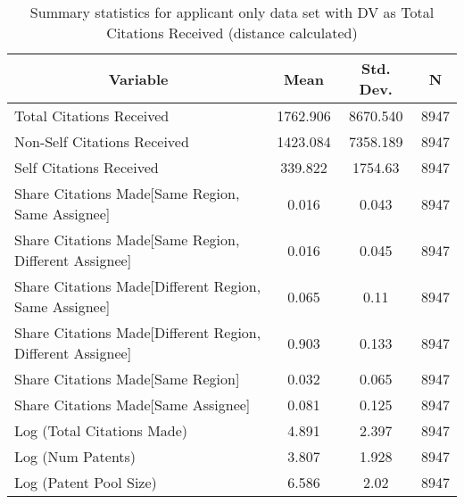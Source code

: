 
\begin{table}[htbp]\centering \caption{Summary statistics for applicant only data set with DV as Total Citations Received (distance calculated) \label{a.tsummary}}
\begin{tabular}{l c c  c}\hline\hline
\multicolumn{1}{c}{\textbf{Variable}} & \textbf{Mean}
 & \textbf{Std. Dev.} & \textbf{N}\\ \hline
Total Citations Received & 1762.906 & 8670.540  & 8947\\
Non-Self Citations Received & 1423.084 & 7358.189  & 8947\\
Self Citations Received & 339.822 & 1754.63  & 8947\\
Share Citations Made[Same Region, Same Assignee] & 0.016 & 0.043  & 8947\\
Share Citations Made[Same Region, Different Assignee] & 0.016 & 0.045  & 8947\\
Share Citations Made[Different Region, Same Assignee] & 0.065 & 0.11  & 8947\\
Share Citations Made[Different Region, Different Assignee] & 0.903 & 0.133  & 8947\\
Share Citations Made[Same Region] & 0.032 & 0.065  & 8947\\
Share Citations Made[Same Assignee] & 0.081 & 0.125  & 8947\\
Log (Total Citations Made) & 4.891 & 2.397  & 8947\\
Log (Num Patents) & 3.807 & 1.928  & 8947\\
Log (Patent Pool Size) & 6.586 & 2.02  & 8947\\
\hline\end{tabular}
\end{table}
